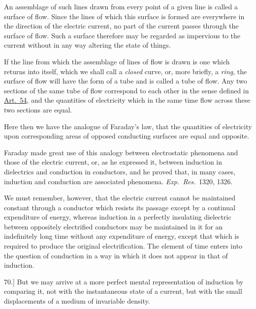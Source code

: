 \documentclass[12pt,oneside]{book}[2021/10/04]
\newcommand{\article}[1]{\phantomsection \label{art:#1}{#1.]}}
\newcommand{\¬}{\hphantom{0}}
\begin{document}
An assemblage of such lines drawn from every point of a given
line is called a surface of flow. Since the lines of which this
surface is formed are everywhere in the direction of the electric
current, no part of the current passes through the surface of flow.
Such a surface therefore may be regarded as impervious to the
current without in any way altering the state of things.

If the line from which the assemblage of lines of flow is drawn
is one which returns into itself, which we shall call a \textit{closed} curve,
or, more briefly, a \textit{ring}, the surface of flow will have the form of a
tube and is called a tube of flow. Any two sections of the same
tube of flow correspond to each other in the sense defined in \hyperref[art:54]{Art.\ 54},
and the quantities of electricity which in the same time flow across
these two sections are equal.

Here then we have the analogue of Faraday's law, that the
quantities of electricity upon corresponding areas of opposed conducting
surfaces are equal and opposite.

Faraday made great use of this analogy between electrostatic
phenomena and those of the electric current, or, as he expressed
it, between induction in dielectrics and conduction in conductors,
and he proved that, in many cases, induction and conduction are
associated phenomena. \textit{Exp.\ Res}.\ 1320, 1326.

We must remember, however, that the electric current cannot
be maintained constant through a conductor which resists its
passage except by a continual expenditure of energy, whereas
induction in a perfectly insulating dielectric between oppositely
electrified conductors may be maintained in it for an indefinitely
long time without any expenditure of energy, except that which
is required to produce the original electrification. The element of
time enters into the question of conduction in a way in which it
does not appear in that of induction.

\article{70} But we may arrive at a more perfect mental representation
of induction by comparing it, not with the instantaneous state of
a current, but with the small displacements of a medium of invariable
density.
\end{document}
